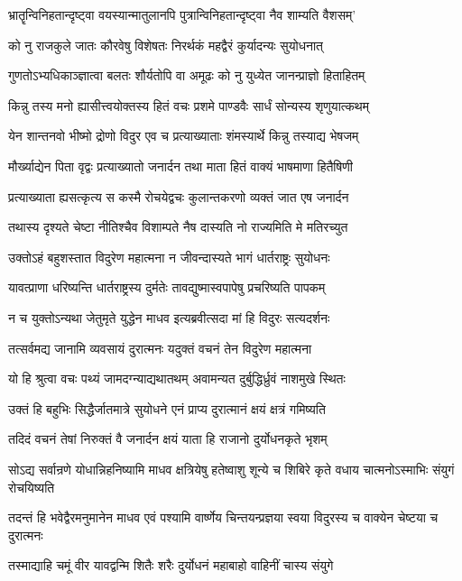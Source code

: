 \twolineshloka
{भ्रातॄन्विनिहतान्दृष्ट्वा वयस्यान्मातुलानपि}
{पुत्रान्विनिहतान्दृष्ट्वा नैव शाम्यति वैशसम्'}


\twolineshloka
{को नु राजकुले जातः कौरवेषु विशेषतः}
{निरर्थकं महद्वैरं कुर्यादन्यः सुयोधनात्}


\twolineshloka
{गुणतोऽभ्यधिकाञ्ज्ञात्वा बलतः शौर्यतोपि वा}
{अमूढः को नु युध्येत जानन्प्राज्ञो हिताहितम्}


\twolineshloka
{किन्नु तस्य मनो ह्यासीत्त्वयोक्तस्य हितं वचः}
{प्रशमे पाण्डवैः सार्धं सोन्यस्य शृणुयात्कथम्}


\twolineshloka
{येन शान्तनवो भीष्मो द्रोणो विदुर एव च}
{प्रत्याख्याताः शंमस्यार्थे किन्नु तस्याद्य भेषजम्}


\twolineshloka
{मौर्ख्याद्येन पिता वृद्वः प्रत्याख्यातो जनार्दन}
{तथा माता हितं वाक्यं भाषमाणा हितैषिणी}


\twolineshloka
{प्रत्याख्याता ह्यसत्कृत्य स कस्मै रोचयेद्वचः}
{कुलान्तकरणो व्यक्तं जात एष जनार्दन}


\twolineshloka
{तथास्य दृश्यते चेष्टा नीतिश्चैव विशाम्पते}
{नैष दास्यति नो राज्यमिति मे मतिरच्युत}


\twolineshloka
{उक्तोऽहं बहुशस्तात विदुरेण महात्मना}
{न जीवन्दास्यते भागं धार्तराष्ट्रः सुयोधनः}


\twolineshloka
{यावत्प्राणा धरिष्यन्ति धार्तराष्ट्रस्य दुर्मतेः}
{तावद्युष्मास्वपापेषु प्रचरिष्यति पापकम्}


\twolineshloka
{न च युक्तोऽन्यथा जेतुमृते युद्धेन माधव}
{इत्यब्रवीत्सदा मां हि विदुरः सत्यदर्शनः}


\twolineshloka
{तत्सर्वमद्य जानामि व्यवसायं दुरात्मनः}
{यदुक्तं वचनं तेन विदुरेण महात्मना}


\twolineshloka
{यो हि श्रुत्वा वचः पथ्यं जामदग्न्याद्यथातथम्}
{अवामन्यत दुर्बुद्धिर्ध्रुवं नाशमुखे स्थितः}


\twolineshloka
{उक्तं हि बहुभिः सिद्धैर्जातमात्रे सुयोधने}
{एनं प्राप्य दुरात्मानं क्षयं क्षत्रं गमिष्यति}


\twolineshloka
{तदिदं वचनं तेषां निरुक्तं वै जनार्दन}
{क्षयं याता हि राजानो दुर्योधनकृते भृशम्}


सोऽद्य सर्वान्रणे योधान्निहनिष्यामि माधव
\twolineshloka
{क्षत्रियेषु हतेष्वाशु शून्ये च शिबिरे कृते}
{वधाय चात्मनोऽस्माभिः संयुगं रोचयिष्यति}


\threelineshloka
{तदन्तं हि भवेद्वैरमनुमानेन माधव}
{एवं पश्यामि वार्ष्णेय चिन्तयन्प्रज्ञया स्वया}
{विदुरस्य च वाक्येन चेष्टया च दुरात्मनः}


\twolineshloka
{तस्माद्याहि चमूं वीर यावद्वन्मि शितैः शरैः}
{दुर्योधनं महाबाहो वाहिनीं चास्य संयुगे}


